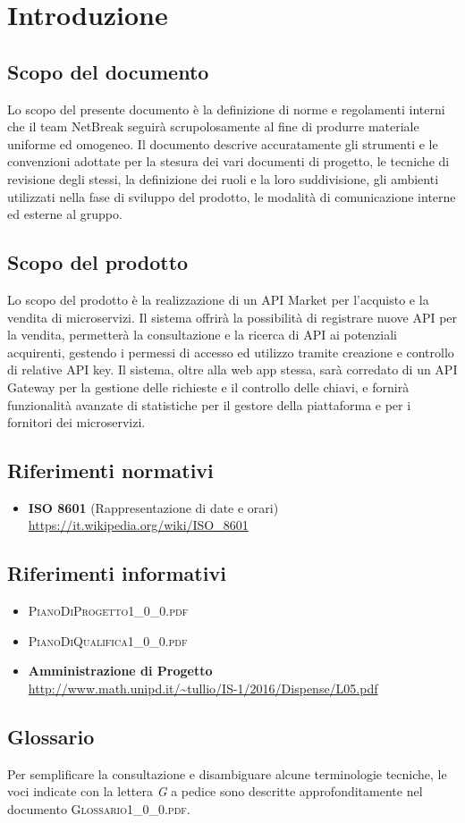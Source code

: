 \newpage
\section{Introduzione}

\subsection{Scopo del documento}
Lo scopo del presente documento è la definizione di norme e regolamenti interni che il team NetBreak seguirà scrupolosamente al fine di produrre materiale uniforme ed omogeneo. Il documento descrive accuratamente gli strumenti e le convenzioni adottate per la stesura dei vari documenti di progetto, le tecniche di revisione degli stessi, la definizione dei ruoli e la loro suddivisione, gli ambienti utilizzati nella fase di sviluppo del prodotto, le modalità di comunicazione interne ed esterne al gruppo.

\subsection{Scopo del prodotto}
Lo scopo del prodotto è la realizzazione di un API Market per l'acquisto e la vendita di microservizi. Il sistema offrirà la possibilità di registrare nuove API per la vendita, permetterà la consultazione e la ricerca di API ai potenziali acquirenti, gestendo i permessi di accesso ed utilizzo tramite creazione e controllo di relative API key. Il sistema, oltre alla web app stessa, sarà corredato di un API Gateway per la gestione delle richieste e il controllo delle chiavi, e fornirà funzionalità avanzate di statistiche per il gestore della piattaforma e per i fornitori dei microservizi.

\subsection{Riferimenti normativi}
\begin{itemize}
	\item \textbf{ISO 8601} (Rappresentazione di date e orari)\\
	\url{https://it.wikipedia.org/wiki/ISO\_8601}
\end{itemize}

\subsection{Riferimenti informativi}
\begin{itemize}
	\item \textsc{PianoDiProgetto1\_0\_0.pdf}
	\item \textsc{PianoDiQualifica1\_0\_0.pdf}
	\item \textbf{Amministrazione di Progetto}\\
	\url{http://www.math.unipd.it/~tullio/IS-1/2016/Dispense/L05.pdf}
\end{itemize}

\subsection{Glossario}
Per semplificare la consultazione e disambiguare alcune terminologie tecniche, le voci indicate con la lettera \textit{G} a pedice sono descritte approfonditamente nel documento \textsc{Glossario1\_0\_0.pdf}.